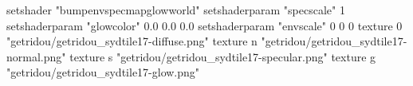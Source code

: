setshader "bumpenvspecmapglowworld"
setshaderparam "specscale" 1
setshaderparam "glowcolor" 0.0 0.0 0.0
setshaderparam "envscale" 0 0 0
texture 0 "getridou/getridou_sydtile17-diffuse.png"
texture n "getridou/getridou_sydtile17-normal.png"
texture s "getridou/getridou_sydtile17-specular.png"
texture g "getridou/getridou_sydtile17-glow.png"